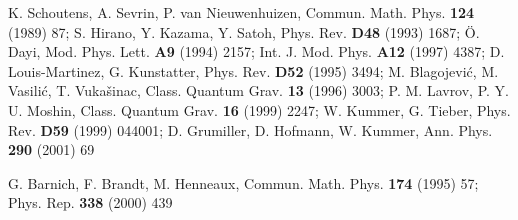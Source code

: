 \documentclass[a4paper,12pt]{article}
\begin{document}
\begin{thebibliography}{99}
  K. Schoutens, A. Sevrin, P. van Nieuwenhuizen, Commun. Math.
Phys. \textbf{124} (1989) 87; S. Hirano, Y. Kazama, Y. Satoh, Phys. Rev. 
\textbf{D48} (1993) 1687; \"{O}. Dayi, Mod. Phys. Lett. \textbf{A9} (1994)
2157; Int. J. Mod. Phys. \textbf{A12} (1997) 4387; D. Louis-Martinez, G.
Kunstatter, Phys. Rev. \textbf{D52} (1995) 3494; M. Blagojevi\'{c}, M.
Vasili\'{c}, T. Vuka\v {s}inac, Class. Quantum Grav. \textbf{13} (1996)
3003; P. M. Lavrov, P. Y. U. Moshin, Class. Quantum Grav. \textbf{16} (1999)
2247; W. Kummer, G. Tieber, Phys. Rev. \textbf{D59} (1999) 044001; D.
Grumiller, D. Hofmann, W. Kummer, Ann. Phys. \textbf{290} (2001) 69

  G. Barnich, F. Brandt, M. Henneaux, Commun. Math. Phys. 
\textbf{174} (1995) 57; Phys. Rep. \textbf{338} (2000) 439
\end{thebibliography}
\end{document}
